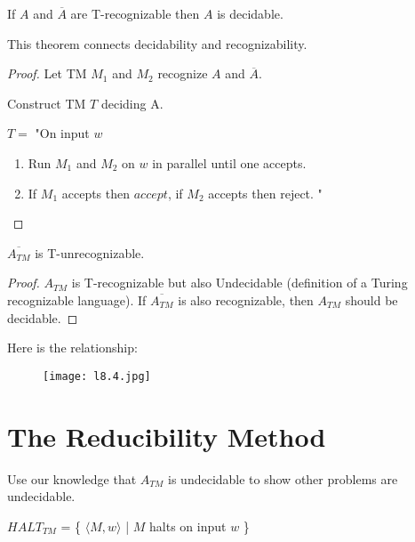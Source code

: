 \begin{theorem}
    If \(A\)  and \(\overline{A}\) are T-recognizable then \(A\) is decidable. 
\end{theorem}

This theorem connects decidability and recognizability.

\begin{proof}
    Let TM \(M_1\) and \(M_2\) recognize \(A\) and \(\overline{A}\).     

    Construct TM \(T\) deciding A. 

    \(T = \) "On input \(w\)
    \begin{enumerate}
        \item Run \(M_1\) and \(M_2\) on \(w\) in parallel until one accepts.
        \item If \(M_1\) accepts then \(accept\), if \(M_2\) accepts then reject. "
    \end{enumerate}  
\end{proof}

\begin{corollary}
    \(\overline{A_{TM}}\) is T-unrecognizable. 
\end{corollary}
\begin{proof}
    \(A_{TM}\) is T-recognizable but also Undecidable (definition of a Turing recognizable language). 
    If \(\overline{A_{TM}}\) is also recognizable, then \(A_{TM}\) should be decidable.  
\end{proof}

Here is the relationship:
    \begin{figure}[H]
    \centering
    \texttt{[image: l8.4.jpg]}
    \caption{}
    \end{figure}

\section{The Reducibility Method}

Use our knowledge that \(A_{TM}\) is undecidable to show other problems are undecidable. 

\begin{definition}
    \(HALT_{TM}\) = \{ \( \langle M, w \rangle\) | \(M\) halts on input \(w\) \}  
\end{definition}

